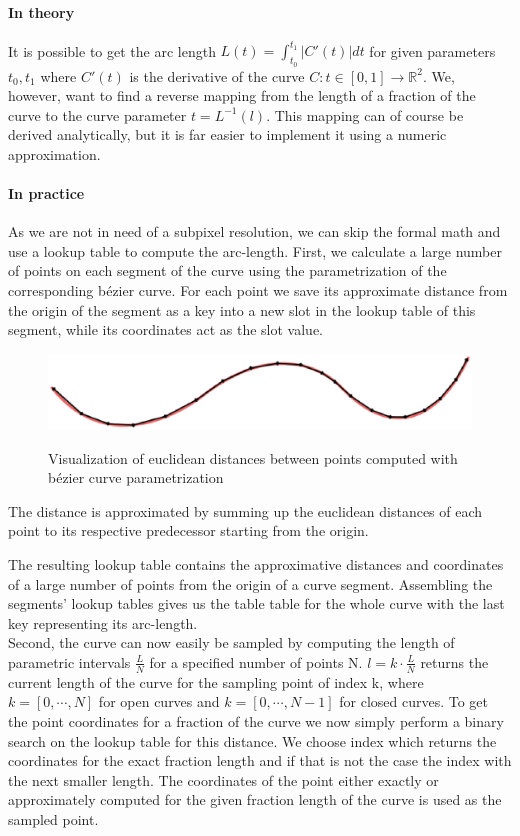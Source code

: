 \paragraph{In theory}
It is possible to get the arc length $L(t)=\int_{t_{0}}^{t_{1}} \left|C'(t)\right| dt$ for given parameters $t_{0}, t_{1}$ where $C'(t)$ is the derivative of the curve $C:t \in [0,1] \rightarrow \mathbb{R}^2$. We, however, want to find a reverse mapping from the length of a fraction of the curve to the curve parameter $t = L^{-1}(l)$. 
This mapping can of course be derived analytically, but it is far easier to implement it using a numeric approximation. 

\paragraph{In practice}
As we are not in need of a subpixel resolution, we can skip the formal math and use a lookup table to compute the arc-length.
First, we calculate a large number of points on each segment of the curve using the parametrization of the corresponding b\'{e}zier curve. For each point we save its approximate distance from the origin of the segment as a key into a new slot in the lookup table of this segment, while its coordinates act as the slot value. 
\begin{figure}[h!]
\centering
\includegraphics[width=\textwidth]{./resources/figures/lookup_table.eps}
\label{fig:lookup}
\caption{Visualization of euclidean distances between points computed with b\'{e}zier curve parametrization}
\end{figure}
The distance is approximated by summing up the euclidean distances of each point to its respective predecessor starting from the origin.

The resulting lookup table contains the approximative distances and coordinates of a large number of points from the origin of a curve segment. Assembling the segments' lookup tables gives us the table table for the whole curve with the last key representing its arc-length.\\ 
Second, the curve can now easily be sampled by computing the length of parametric intervals $\frac{L}{N}$ for a specified number of points N. $l=k \cdot \frac{L}{N}$ returns the current length of the curve for the sampling point of index k, where $k=[0,\cdots,N]$ for open curves and $k=[0,\cdots,N-1]$ for closed curves.
To get the point coordinates for a fraction of the curve we now simply perform a binary search on the lookup table for this distance. We choose index which returns the coordinates for the exact fraction length and if that is not the case the index with the next smaller length. The coordinates of the point either exactly or approximately computed for the given fraction length of the curve is used as the sampled point.

